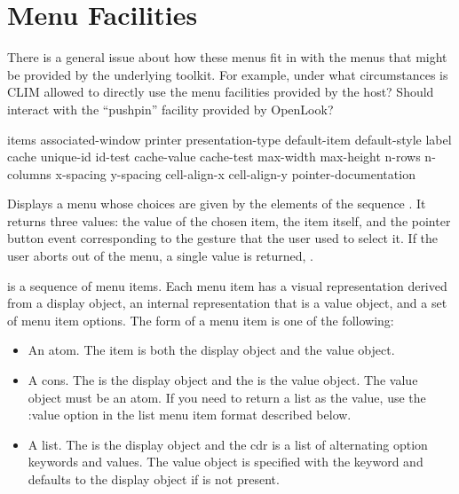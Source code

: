 
\chapter {Menu Facilities}
\label {menus}

 {There is a general issue about how these menus fit in with the
menus that might be provided by the underlying toolkit.  For example, under what
circumstances is CLIM allowed to directly use the menu facilities provided by
the host?  Should  interact with the ``pushpin''
facility provided by OpenLook?}


 {items \key associated-window printer presentation-type
                                      default-item default-style label
                                      cache unique-id id-test cache-value cache-test
                                      max-width max-height n-rows n-columns
                                      x-spacing y-spacing
                                      cell-align-x cell-align-y
                                      pointer-documentation}

Displays a menu whose choices are given by the elements of the sequence
.  It returns three values:  the value of the chosen item, the item
itself, and the pointer button event corresponding to the gesture that the user
used to select it.  If the user aborts out of the menu, a single value is
returned, .

 is a sequence of menu items.  Each menu item has a visual
representation derived from a display object, an internal representation that is
a value object, and a set of menu item options.  The form of a menu item is one
of the following:

\begin{itemize}
\item An atom. The item is both the display object and the value object.

\item A cons. The  is the display object and the  is the value
object.  The value object must be an atom. If you need to return a list as the
value, use the :value option in the list menu item format described below.

\item A list. The  is the display object and the cdr is a list of
alternating option keywords and values.  The value object is specified with the
keyword  and defaults to the display object if  is not
present.
\end{itemize}

